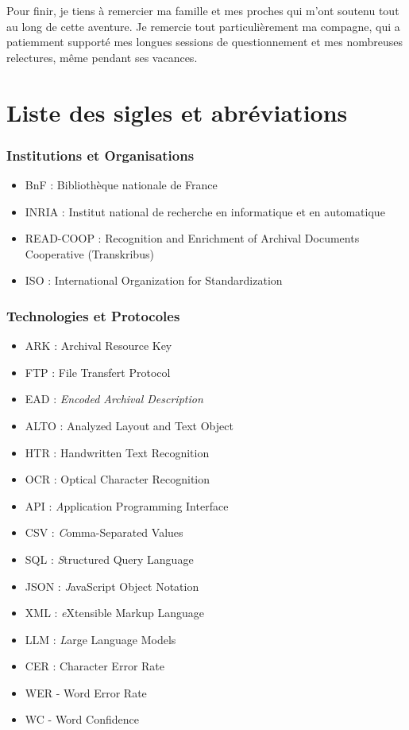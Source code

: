 \documentclass[a4paper,12pt,twoside]{book}
\begin{document}
Pour finir, je tiens à remercier ma famille et mes proches qui m’ont soutenu tout au long de cette aventure. Je remercie tout particulièrement ma compagne, qui a patiemment supporté mes longues sessions de questionnement et mes nombreuses relectures, même pendant ses vacances.

\chapter{Liste des sigles et abréviations}

\subsection*{Institutions et Organisations}

\begin{itemize}
	\item BnF : Bibliothèque nationale de France 
	\item INRIA : Institut national de recherche en informatique et en automatique
	\item READ-COOP : Recognition and Enrichment of Archival Documents Cooperative  (Transkribus)
	\item ISO : International Organization for Standardization
\end{itemize}

\subsection*{Technologies et Protocoles}

\begin{itemize}
	\item ARK : Archival Resource Key
	\item FTP : File Transfert Protocol
	\item EAD : \textit{Encoded Archival Description}
	\item ALTO : Analyzed Layout and Text Object
	\item HTR : Handwritten Text Recognition 
	\item OCR : Optical Character Recognition
	\item API : \textit Application Programming Interface
	\item CSV : \textit Comma-Separated Values
	\item SQL : \textit Structured Query Language
	\item JSON : \textit JavaScript Object Notation
	\item XML : \textit eXtensible Markup Language
	\item LLM : \textit Large Language Models
	\item CER : Character Error Rate 
	\item WER - Word Error Rate
	\item WC - Word Confidence 
\end{itemize}
\end{document}
